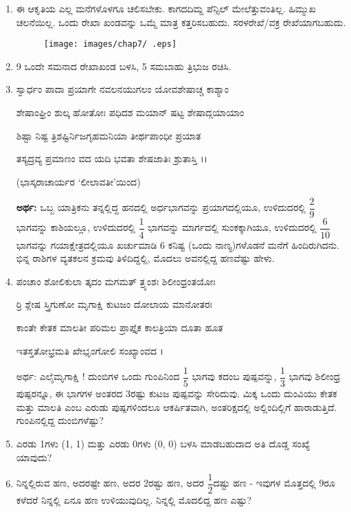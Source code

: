 \begin{enumerate}
\item ಈ ಆಕೃತಿಯ ಎಲ್ಲ ಮನೆಗಳೊಳಗೂ ಚಲಿಸಬೇಕು. ಕಾಗದದಿಮ್ದ ಪೆನ್ಸಿಲ್ ಮೇಲೆತ್ತುವಂತಿಲ್ಲ. ಹಿಮ್ಮುಖ ಚಲನೆಯಿಲ್ಲ. ಒಂದು ರೇಖಾ ಖಂಡವನ್ನು ಒಮ್ಮೆ ಮಾತ್ರ ಕತ್ತರಿಸಬಹುದು. ಸರಳರೇಖೆ/ವಕ್ರ ರೇಖೆಯಾಗಬಹುದು. 

\begin{figure}[!h]
\centering
\texttt{[image: images/chap7/ .eps]}
\end{figure}

\item 9 ಒಂದೇ ಸಮನಾದ ರೇಖಾಖಂಡ ಬಳಸಿ, 5 ಸಮಬಾಹು ತ್ರಿಭುಜ ರಚಿಸಿ. 

\item ಸ್ವಾರ್ಧಂ ಪಾದಾ ಪ್ರಯಾಗೇ ನವಲನಯುಗಲಂ ಯೋವಶೇಷಾಚ್ಚ ಕಾಶ್ಯಾಂ 

ಶೇಷಾಂಘ್ರಿಂ ಶುಲ್ಕ ಹೋತೋಃ ಪಧಿದಶ ಮಯಾನ್ ಷಟ್ಟ ಶೇಷಾದ್ಗಯಾಯಾಂ 

ಶಿಷ್ಟಾ ನಿಷ್ಟ ತ್ರಿಶಷ್ಟಿರ್ನಿಜಗೃಹಮನಿಯಾ ತೀರ್ಥಪಾಂಧೀ ಪ್ರಯಾತ 

ತಸ್ಯದ್ರವ್ಯ ಪ್ರಮಾಣಂ ವದ ಯದಿ ಭವತಾ ಶೇಷಜಾತಿಃ ಶ್ರುತಾಸ್ತಿ ।।

\hfill (ಭಾಸ್ಕರಾಚಾರ್ಯರ `ಲೀಲಾವತೀ'ಯಿಂದ)


{\bf ಅರ್ಥ:} ಒಬ್ಬ ಯಾತ್ರಿಕನು ತನ್ನಲ್ಲಿದ್ದ ಹನದಲ್ಲಿ ಅರ್ಧಭಾಗವನ್ನು ಪ್ರಯಾಗದಲ್ಲಿಯೂ, ಉಳಿದುದರಲ್ಲಿ $\dfrac{2}{9}$ ಭಾಗವನ್ನು ಕಾಶಿಯಲ್ಲೂ, ಉಳಿದುದರಲ್ಲಿ $\dfrac{1}{4}$ ಭಾಗವನ್ನು ಮಾರ್ಗದಲ್ಲಿ ಸುಂಕಕ್ಕಾಗಿಯೂ, ಉಳಿದುದರಲ್ಲಿ $\dfrac{6}{10}$ ಭಾಗವನ್ನು ಗಯಾಕ್ಷೇತ್ರದಲ್ಲಿಯೂ ಖರ್ಚುಮಾಡಿ 6 ಕನಿಷ್ಟ (ಒಂದು ನಾಣ್ಯ)ಗಳೊಡನೆ ಮನೆಗೆ ಹಿಂದಿರುಗಿದನು. ಭಿನ್ನ ರಾಶಿಗಳ ವ್ಯತಕಲನ ಕ್ರಮವು ತಿಳಿದಿದ್ದಲ್ಲಿ, ಮೊದಲು ಅವನಲ್ಲಿದ್ದ ಹಣವೆಷ್ಟು ಹೇಳು.

\item ಪಂಚಾಂ ಶೋಲಿಕುಲಾ ತ್ಕದಂ ಮಗಮತ್ ತ್ರ್ಯಂಶಃ ಶಿಲೀಂಧ್ರಂತಯೋಃ 

ರ್ರಿ ಶ್ಲೇಷ ಸ್ತ್ರಿಗುಣೋ ಮೃಗಾಕ್ಷಿ ಕುಟಜಂ ದೋಲಾಯ ಮಾನೋತರಃ 

ಕಾಂತೇ ಕೇತಕ ಮಾಲತೀ ಪರಿಮಲ ಪ್ರಾಪ್ತೈಕ ಕಾಲತ್ರಿಯಾ ದೂತಾ ಹೂತ 

ಇತಸ್ತತೋಭ್ರಮತಿ ಖೇಭೃಂಗೋಲಿ ಸಂಖ್ಯಾಂವದ ।

ಅರ್ಥ: ಎಲೈಮೃಗಾಕ್ಷಿ ! ದುಂಬಿಗಳ ಒಂದು ಗುಂಪಿನಿಂದ $\dfrac{1}{5}$ ಭಾಗವು ಕದಂಬ ಪುಷ್ಪವನ್ನು, $\dfrac{1}{3}$ ಭಾಗವು ಶಿಲೀಂಧ್ರ ಪುಷ್ಪರನ್ನೂ, ಈ ಭಾಗಗಳ ಅಂತರದ 3ರಷ್ಟು ಕುಟಜ ಪುಷ್ಪವನ್ನು ಸೇರಿದುವು. ಮಿಕ್ಕ ಒಂದು ದುಂವಿಯು ಕೇತಕ ಮತ್ತು ಮಾಲತಿ ಎಂಬ ಎರುಡು ಪುಷ್ಪಗಳಿಂದಲೂ ಆಕರ್ಷಿತವಾಗಿ, ಅಂತರಿಕ್ಷದಲ್ಲಿ ಅಲ್ಲಿಂದಿಲ್ಲಿಗೆ ಹಾರಾಡುತ್ತಿದೆ. ಗುಂಪಿನಲ್ಲಿದ್ದ ದುಂಬಿಗಳೆಷ್ಟು?  

\item ಎರಡು 1ಗಳು (1, 1) ಮತ್ತು ಎರಡು 0ಗಳು (0, 0) ಬಳಸಿ ಮಾಡಬಹುದಾದ ಅತಿ ದೊಡ್ಡ ಸಂಖ್ಯೆ ಯಾವುದು? 

\item ನಿನ್ನಲ್ಲಿರುವ ಹಣ, ಅದರಷ್ಟೇ ಹಣ, ಅದರ 2ರಷ್ಟು ಹಣ, ಅದರ $\dfrac{1}{2}$ದಷ್ಟು ಹಣ - ಇವುಗಳ ಮೊತ್ತದಲ್ಲಿ 9ರೂ ಕಳೆದರೆ ನಿನ್ನಲ್ಲಿ ಏನೂ ಹಣ ಉಳಿಯುವುದಿಲ್ಲ. ನಿನ್ನಲ್ಲಿ ಮೊದಲಿದ್ದ ಹಣ ಎಷ್ಟು? 


\end{enumerate}
